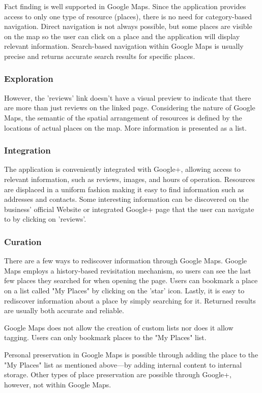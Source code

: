 {{{Fact finding is well supported in Google Maps. Since the application provides access to only one type of resource (places), there is no need for category-based navigation. Direct navigation is not always possible, but some places are visible on the map so the user can click on a place and the application will display relevant information. Search-based navigation within Google Maps is usually precise and returns accurate search results for specific places. 
}
{\subsubsection{Exploration}
However, the 'reviews' link doesn't have a visual preview to indicate that there are more than just reviews on the linked page. Considering the nature of Google Maps, the semantic of the spatial arrangement of resources is defined by the locations of actual places on the map. More information is presented as a list. 
}
{\subsubsection{Integration}
The application is conveniently integrated with Google+, allowing access to relevant information, such as reviews, images, and hours of operation. Resources are displaced in a uniform fashion making it easy to find information such as addresses and contacts. Some interesting information can be discovered on the business' official Website or integrated Google+ page that the user can navigate to by clicking on 'reviews'.}
{\subsubsection{Curation}There are a few ways to rediscover information through Google Maps. Google Maps employs a history-based revisitation mechanism, so users can see the last few places they searched for when opening the page. Users can bookmark a place on a list called "My Places" by clicking on the 'star' icon. Lastly, it is easy to rediscover information about a place by simply searching for it. Returned results are usually both accurate and reliable.

Google Maps does not allow the creation of custom lists nor does it allow tagging. Users can only bookmark places to the "My Places" list. 

Personal preservation in Google Maps is possible through adding the place to the "My Places" list as mentioned above---by adding internal content to internal storage. Other types of place preservation are possible through Google+, however, not within Google Maps.

}}}
